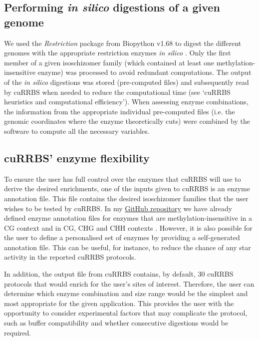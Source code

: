 \subsection*{Performing \textit{in silico} digestions of a given genome}

We used the \textit{Restriction} package from Biopython v1.68 to digest the different genomes with the appropriate restriction enzymes \textit{in silico} \citep{Cock2009}. Only the first member of a given isoschizomer family (which contained at least one methylation-insensitive enzyme) was processed to avoid redundant computations. The output of the \textit{in silico} digestions was stored (pre-computed files) and subsequently read by cuRRBS when needed to reduce the computational time (see `cuRRBS heuristics and computational efficiency'). When assessing enzyme combinations, the information from the appropriate individual pre-computed files (i.e. the genomic coordinates where the enzyme theoretically cuts) were combined by the software to compute all the necessary variables.

\subsection*{cuRRBS' enzyme flexibility}

To ensure the user has full control over the enzymes that cuRRBS will use to derive the desired enrichments, one of the inputs given to cuRRBS is an enzyme annotation file. This file contains the desired isoschizomer families that the user wishes to be tested by cuRRBS. In my \href{https://github.com/demh/cuRRBS/tree/master/utils}{GitHub repository} we have already defined enzyme annotation files for enzymes that are methylation-insensitive in a CG context and in CG, CHG and CHH contexts \citep{Martin-Herranz2017}. However, it is also possible for the user to define a personalised set of enzymes by providing a self-generated annotation file. This can be useful, for instance, to reduce the chance of any star activity in the reported cuRRBS protocols.

\bigskip

In addition, the output file from cuRRBS contains, by default, 30 cuRRBS protocols that would enrich for the user's sites of interest. Therefore, the user can determine which enzyme combination and size range would be the simplest and most appropriate for the given application. This provides the user with the opportunity to consider experimental factors that may complicate the protocol, such as buffer compatibility and whether consecutive digestions would be required.

